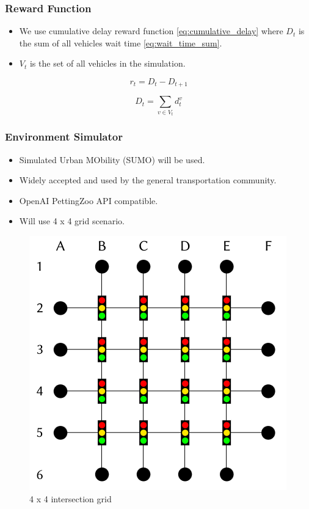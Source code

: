 \documentclass[compress,12pt]{beamer}
\begin{document}
\begin{frame}[bg=arguelles.png]
      \frametitle{Reward Function}
      \begin{itemize}
      \item We use cumulative delay reward function \ref{eq:cumulative_delay} where \(D_t\) is the sum of all vehicles wait time \ref{eq:wait_time_sum}.
      \item \(V_t\) is the set of all vehicles in the simulation.
      \end{itemize}

    \begin{equation}
    r_t = D_t - D_{t+1}
    \label{eq:cumulative_delay}
    \end{equation}

    \begin{equation}
    D_t = \sum_{v \in V_t} d_t^v
    \label{eq:wait_time_sum}
    \end{equation}
\end{frame}

\begin{frame}[bg=arguelles.png]
      \frametitle{Environment Simulator}
      \begin{itemize}
      \item Simulated Urban MObility (SUMO) will be used.
      \item Widely accepted and used by the general transportation community.
      \item OpenAI PettingZoo API compatible.
      \item Will use 4 x 4 grid scenario.
      \end{itemize}

    \begin{figure}[htbp]
      \centering
      \includegraphics[width=0.4\linewidth]{4x4.png}
      \caption{4 x 4 intersection grid}
      \label{fig:intersection_grid}
    \end{figure}

\end{frame}
\end{document}
